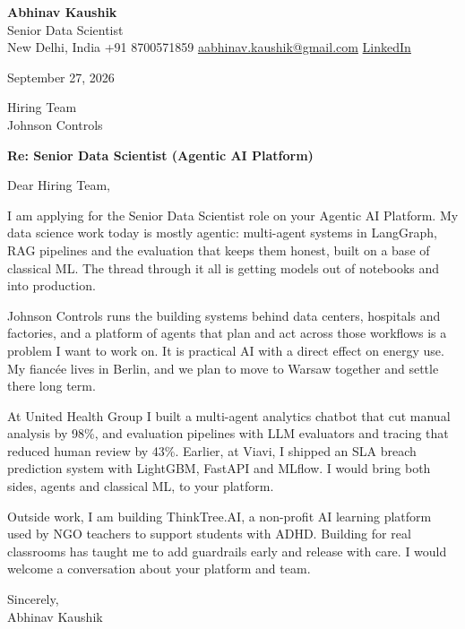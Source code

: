 \documentclass[11pt,a4paper]{article}
\begin{document}
{\Large\bfseries Abhinav Kaushik}\\
Senior Data Scientist\\
New Delhi, India \textbar{} +91 8700571859 \textbar{} \href{mailto:aabhinav.kaushik@gmail.com}{aabhinav.kaushik@gmail.com} \textbar{} \href{https://www.linkedin.com/in/abhinav-kaushik10/}{LinkedIn}  

September 27, 2026

Hiring Team\\
Johnson Controls

\textbf{Re: Senior Data Scientist (Agentic AI Platform)}

Dear Hiring Team,

I am applying for the Senior Data Scientist role on your Agentic AI Platform. My data science work today is mostly agentic: multi-agent systems in LangGraph, RAG pipelines and the evaluation that keeps them honest, built on a base of classical ML. The thread through it all is getting models out of notebooks and into production.

Johnson Controls runs the building systems behind data centers, hospitals and factories, and a platform of agents that plan and act across those workflows is a problem I want to work on. It is practical AI with a direct effect on energy use. My fiancée lives in Berlin, and we plan to move to Warsaw together and settle there long term.

At United Health Group I built a multi-agent analytics chatbot that cut manual analysis by 98\%, and evaluation pipelines with LLM evaluators and tracing that reduced human review by 43\%. Earlier, at Viavi, I shipped an SLA breach prediction system with LightGBM, FastAPI and MLflow. I would bring both sides, agents and classical ML, to your platform.

Outside work, I am building ThinkTree.AI, a non-profit AI learning platform used by NGO teachers to support students with ADHD. Building for real classrooms has taught me to add guardrails early and release with care. I would welcome a conversation about your platform and team.

Sincerely,\\[4pt]
Abhinav Kaushik
\end{document}
